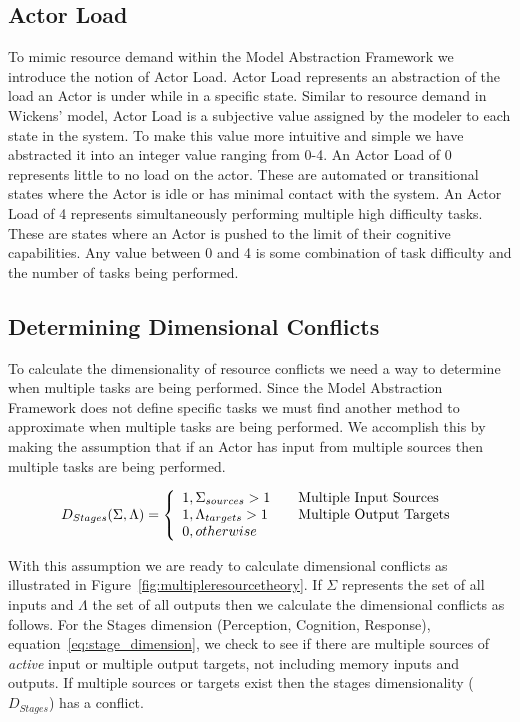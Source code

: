   
\subsection{Actor Load}
To mimic resource demand within the Model Abstraction Framework we introduce the notion of Actor Load.  Actor Load represents an abstraction of the load an Actor is under while in a specific state.  Similar to resource demand in Wickens' model, Actor Load is a subjective value assigned by the modeler to each state in the system.  To make this value more intuitive and simple we have abstracted it into an integer value ranging from 0-4.  An Actor Load of 0 represents little to no load on the actor.  These are automated or transitional states where the Actor is idle or has minimal contact with the system.  An Actor Load of 4 represents simultaneously performing multiple high difficulty tasks.  These are states where an Actor is pushed to the limit of their cognitive capabilities. Any value between 0 and 4 is some combination of task difficulty and the number of tasks being performed.

\subsection{Determining Dimensional Conflicts}
To calculate the dimensionality of resource conflicts we need a way to determine when multiple tasks are being performed.  Since the Model Abstraction Framework does not define specific tasks we must find another method to approximate when multiple tasks are being performed.  We accomplish this by making the assumption that if an Actor has input from multiple sources then multiple tasks are being performed.

\begin{equation}
D_{Stages}(\Sigma, \Lambda) = \left\{ 
  \begin{array}{l l}
    1, \Sigma_{sources} > 1 & \quad \text{Multiple Input Sources}\\
    1, \Lambda_{targets} > 1 & \quad \text{Multiple Output Targets}\\
    0, otherwise
  \end{array}
  \right.
  \label{eq:stage_dimension}
\end{equation}

With this assumption we are ready to calculate dimensional conflicts as illustrated in Figure~\ref{fig:multipleresourcetheory}.  If $\Sigma$ represents the set of all inputs and $\Lambda$ the set of all outputs then we calculate the dimensional conflicts as follows.  For the Stages dimension (Perception, Cognition, Response), equation~\ref{eq:stage_dimension}, we check to see if there are multiple sources of {\em active} input or multiple output targets, not including memory inputs and outputs.  If multiple sources or targets exist then the stages dimensionality ($D_{Stages}$) has a conflict.

